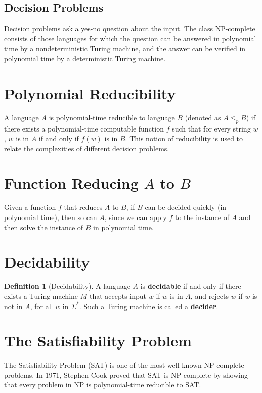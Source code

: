 \documentclass[12pt,openany]{book}
\theoremstyle{definition}
\newtheorem{definition}{Definition}[chapter]
\begin{document}
\subsection{Decision Problems}
Decision problems ask a yes-no question about the input. The class NP-complete consists of those languages for which the question can be answered in polynomial time by a nondeterministic Turing machine, and the answer can be verified in polynomial time by a deterministic Turing machine.

\section{Polynomial Reducibility}
A language \( A \) is polynomial-time reducible to language \( B \) (denoted as \( A \leq_p B \)) if there exists a polynomial-time computable function \( f \) such that for every string \( w \), \( w \) is in \( A \) if and only if \( f(w) \) is in \( B \). This notion of reducibility is used to relate the complexities of different decision problems.

\section{Function Reducing \( A \) to \( B \)}
Given a function \( f \) that reduces \( A \) to \( B \), if \( B \) can be decided quickly (in polynomial time), then so can \( A \), since we can apply \( f \) to the instance of \( A \) and then solve the instance of \( B \) in polynomial time.

\section{Decidability}
\begin{definition}[Decidability]
	A language \( A \) is \textbf{decidable} if and only if there exists a Turing machine \( M \) that accepts input \( w \) if \( w \) is in \( A \), and rejects \( w \) if \( w \) is not in \( A \), for all \( w \) in \( \Sigma^* \). Such a Turing machine is called a \textbf{decider}.
\end{definition}

\section{The Satisfiability Problem}
The Satisfiability Problem (SAT) is one of the most well-known NP-complete problems. In 1971, Stephen Cook proved that SAT is NP-complete by showing that every problem in NP is polynomial-time reducible to SAT.
\end{document}
